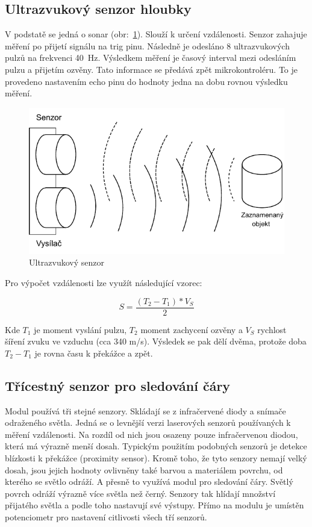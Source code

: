 \subsection*{Ultrazvukový senzor hloubky} \label{theory:ultrasonic}
V podstatě se jedná o sonar (obr:~\ref{fig:ultrasonic}). Slouží k určení vzdálenosti. Senzor zahajuje měření po přijetí signálu na trig pinu. Následně je odesláno 8 ultrazvukových pulzů na frekvenci 40~Hz. Výsledkem měření je časový interval mezi odesláním pulzu a přijetím ozvěny. Tato informace se předává zpět mikrokontroléru. To je provedeno nastavením echo pinu do hodnoty jedna na dobu rovnou výsledku měření. \cite[str:~93]{embeded_robotics}

\begin{figure}[h!]
	\centering
	\includegraphics[scale=0.75]{obrazky-figures/ultrasonic.pdf}
	\caption{Ultrazvukový senzor}
	\label{fig:ultrasonic}
\end{figure}

Pro výpočet vzdálenosti lze využít následující vzorec:

\begin{equation}
	S = \frac{(T_2 - T_1) * V_S}{2}
\end{equation}

Kde $T_1$ je moment vyslání pulzu, $T_2$ moment zachycení ozvěny a $V_S$ rychlost šíření zvuku ve vzduchu (cca 340 m/s). Výsledek se pak dělí dvěma, protože doba $T_2 - T_1$ je rovna času k překážce a zpět. \cite[str:~132]{mobilní_roboty}

\newpage
\subsection*{Třícestný senzor pro sledování čáry}
Modul používá tři stejné senzory. Skládají se z infračervené diody a snímače odraženého světla. Jedná se o levnější verzi laserových senzorů používaných k měření vzdálenosti. Na rozdíl od nich jsou osazeny pouze infračervenou diodou, která má výrazně menší dosah. Typickým použitím podobných senzorů je detekce blízkosti k překážce (proximity sensor). Kromě toho, že tyto senzory nemají velký dosah, jsou jejich hodnoty ovlivněny také barvou a materiálem povrchu, od kterého se světlo odráží. A přesně to využívá modul pro sledování čáry. Světlý povrch odráží výrazně více světla než černý. Senzory tak hlídají množství přijatého světla a podle toho nastavují své výstupy. Přímo na modulu je umístěn potenciometr pro nastavení citlivosti všech tří senzorů. \cite[str:~115, 148]{mobilní_roboty}

